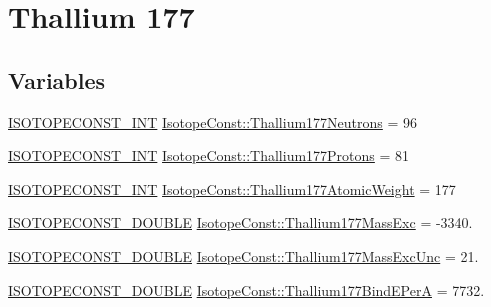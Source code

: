 \hypertarget{group___isotope_const-_thallium-_tl177}{}\section{Thallium 177}
\label{group___isotope_const-_thallium-_tl177}
\subsection*{Variables}
\begin{DoxyCompactItemize}
\item 
\mbox{\hyperlink{group___isotope_const-_macros_ga5f18360b3e99483a35c32d789e62621c}{I\+S\+O\+T\+O\+P\+E\+C\+O\+N\+S\+T\+\_\+\+I\+NT}} \mbox{\hyperlink{group___isotope_const-_thallium-_tl177_ga590b0b118f032789dd72c40244a7cfbc}{Isotope\+Const\+::\+Thallium177\+Neutrons}} = 96
\item 
\mbox{\hyperlink{group___isotope_const-_macros_ga5f18360b3e99483a35c32d789e62621c}{I\+S\+O\+T\+O\+P\+E\+C\+O\+N\+S\+T\+\_\+\+I\+NT}} \mbox{\hyperlink{group___isotope_const-_thallium-_tl177_ga3e16750b69dc3134f2a31a4c5af2c696}{Isotope\+Const\+::\+Thallium177\+Protons}} = 81
\item 
\mbox{\hyperlink{group___isotope_const-_macros_ga5f18360b3e99483a35c32d789e62621c}{I\+S\+O\+T\+O\+P\+E\+C\+O\+N\+S\+T\+\_\+\+I\+NT}} \mbox{\hyperlink{group___isotope_const-_thallium-_tl177_ga06bbaae2fe662b8d554f86f44a942c0a}{Isotope\+Const\+::\+Thallium177\+Atomic\+Weight}} = 177
\item 
\mbox{\hyperlink{group___isotope_const-_macros_ga8f45a7272ce02c0b4c65c44636ed719a}{I\+S\+O\+T\+O\+P\+E\+C\+O\+N\+S\+T\+\_\+\+D\+O\+U\+B\+LE}} \mbox{\hyperlink{group___isotope_const-_thallium-_tl177_ga777d2a0068c2c8c2fe91bc64809e5f66}{Isotope\+Const\+::\+Thallium177\+Mass\+Exc}} = -\/3340.
\item 
\mbox{\hyperlink{group___isotope_const-_macros_ga8f45a7272ce02c0b4c65c44636ed719a}{I\+S\+O\+T\+O\+P\+E\+C\+O\+N\+S\+T\+\_\+\+D\+O\+U\+B\+LE}} \mbox{\hyperlink{group___isotope_const-_thallium-_tl177_ga74a48c0641a5f7e91558cdc0b3861608}{Isotope\+Const\+::\+Thallium177\+Mass\+Exc\+Unc}} = 21.
\item 
\mbox{\hyperlink{group___isotope_const-_macros_ga8f45a7272ce02c0b4c65c44636ed719a}{I\+S\+O\+T\+O\+P\+E\+C\+O\+N\+S\+T\+\_\+\+D\+O\+U\+B\+LE}} \mbox{\hyperlink{group___isotope_const-_thallium-_tl177_gaf2d043d7023af0c344ac5c48c51ccb45}{Isotope\+Const\+::\+Thallium177\+Bind\+E\+PerA}} = 7732.
\item 

\end{DoxyCompactItemize}
